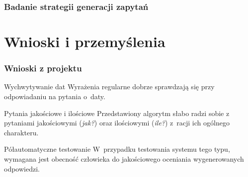 \documentclass{beamer}
\begin{document}
\begin{frame}
  \frametitle{Badanie strategii generacji zapytań}
  \begin{figure}
    \label{fig:porownanie-strategie}
  \end{figure}
\end{frame}

\section{Wnioski i przemyślenia}
\begin{frame}
  \frametitle{Wnioski z projektu}
  \begin{block}{Wychwytywanie dat}
    Wyrażenia regularne dobrze sprawdzają się przy odpowiadaniu na pytania o~daty.
  \end{block}

  \begin{block}{Pytania jakościowe i ilościowe}
    Przedstawiony algorytm słabo radzi sobie z pytaniami jakościowymi (\textit{jak?}) oraz ilościowymi (\textit{ile?}) z~racji ich ogólnego charakteru.
  \end{block}

  \begin{block}{Półautomatyczne testowanie}
    W~przypadku testowania systemu tego typu, wymagana jest obecność człowieka do jakościowego oceniania wygenerowanych odpowiedzi.
  \end{block}
\end{frame}
\end{document}
